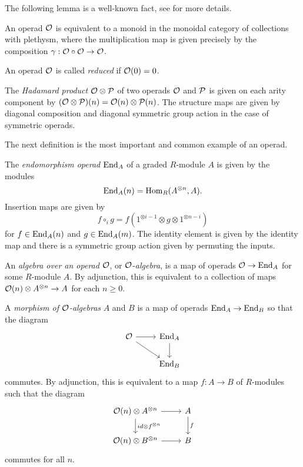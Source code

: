 \documentclass[Thesis.tex]{subfiles}
\begin{document}
The following lemma is a well-known fact, see \cite[\S 5]{lodayvallette} for more details. 
\begin{lem}\label{monoid}
An operad ${\mathcal O}$ is equivalent to a monoid in the monoidal category of collections with plethysm, where the multiplication  map is given precisely by the composition $\gamma:{\mathcal O}\circ{\mathcal O}\to{\mathcal O}$. 
\end{lem}


\begin{defin} An operad ${\mathcal O}$ is called \emph{reduced} if ${\mathcal O}(0)=0$.\end{defin}

\begin{defin}The \emph{Hadamard product} ${\mathcal O}\otimes\mathcal{P}$ of  two operads ${\mathcal O}$ and $\mathcal{P}$ is given on each arity component by $({\mathcal O}\otimes\mathcal{P})(n)={\mathcal O}(n)\otimes\mathcal{P}(n)$. The structure maps are given by diagonal composition and diagonal symmetric group action in the case of symmetric operads. \end{defin}

The next definition is the most important and common example of an operad.
\begin{defin}
The \emph{endomorphism operad} $\operatorname{End}_A$ of a graded $R$-module $A$ is given by the modules \[\operatorname{End}_A(n)=\operatorname{Hom}_R(A^{\otimes n},A).\] Insertion maps are given by
\[f\circ_i g=f(1^{\otimes i-1}\otimes g\otimes 1^{\otimes n-i})\]
for $f\in\operatorname{End}_A(n)$ and $g\in\operatorname{End}_A(m)$. The identity element is given by the identity map and there is a symmetric group action given by permuting the inputs.
\end{defin}
\begin{defin}
An \emph{algebra over an operad} ${\mathcal O}$, or ${\mathcal O}$-\emph{algebra}, is a map of operads ${\mathcal O}\to\operatorname{End}_A$ for some $R$-module $A$. By adjunction, this is equivalent to a collection of maps ${\mathcal O}(n)\otimes A^{\otimes n}\to A$ for each $n\geq 0$.  
\end{defin}


\begin{defin}\label{algebramorphism}
A \emph{morphism of ${\mathcal O}$-algebras} $A$ and $B$ is a map of operads $\operatorname{End}_A\to\operatorname{End}_B$ so that the diagram
\[
\begin{tikzcd}
\OO \arrow[r]\arrow[dr] & \End_A\arrow[d]\\
& \End_B
\end{tikzcd}
\]
commutes. By adjunction, this is equivalent to a map $f:A\to B$ of $R$-modules such that the diagram
\[
\begin{tikzcd}
\OO(n)\otimes A^{\otimes n} \arrow[r]\arrow[d, "id\otimes f^{\otimes n}"] & A\arrow[d, "f"]\\
 \OO(n)\otimes B^{\otimes n}\arrow[r] & B
\end{tikzcd}
\]
commutes for all $n$.
\end{defin}
\end{document}

